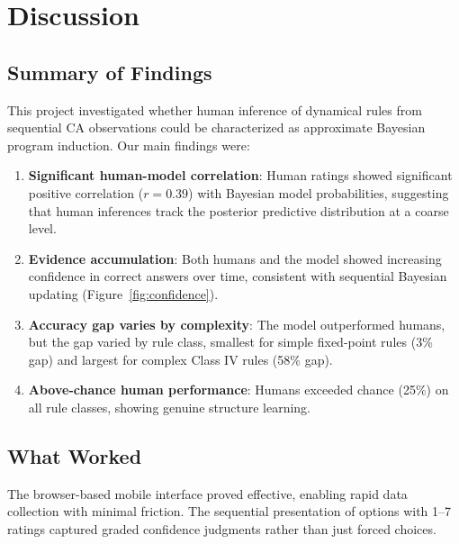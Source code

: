 \documentclass[10pt,letterpaper]{article}
\begin{document}
\section{Discussion}

\subsection{Summary of Findings}

This project investigated whether human inference of dynamical rules from sequential CA observations could be characterized as approximate Bayesian program induction. Our main findings were:

\begin{enumerate}
    \item \textbf{Significant human-model correlation}: Human ratings showed significant positive correlation ($r = 0.39$) with Bayesian model probabilities, suggesting that human inferences track the posterior predictive distribution at a coarse level.
    
    \item \textbf{Evidence accumulation}: Both humans and the model showed increasing confidence in correct answers over time, consistent with sequential Bayesian updating (Figure~\ref{fig:confidence}).
    
    \item \textbf{Accuracy gap varies by complexity}: The model outperformed humans, but the gap varied by rule class, smallest for simple fixed-point rules (3\% gap) and largest for complex Class IV rules (58\% gap).
    
    \item \textbf{Above-chance human performance}: Humans exceeded chance (25\%) on all rule classes, showing genuine structure learning.
\end{enumerate}

\subsection{What Worked}

The browser-based mobile interface proved effective, enabling rapid data collection with minimal friction. The sequential presentation of options with 1--7 ratings captured graded confidence judgments rather than just forced choices.
\end{document}
